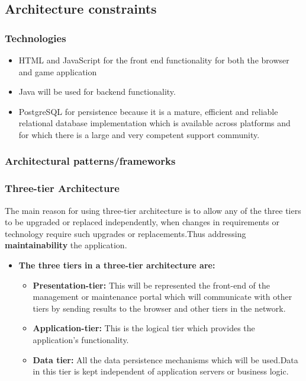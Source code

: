 \documentclass[english]{article}
\begin{document}
			
		\subsection{Architecture constraints}
			\subsubsection{Technologies}
			\begin{itemize}
		  \item HTML and JavaScript for the front end functionality for both the browser and game application
		  \item Java will be used for backend functionality.
		  \item PostgreSQL for persistence because it is a mature, efficient and reliable relational database
          implementation which is available across platforms and for which there is a large and very competent
         support community.
       \end{itemize}
		\subsubsection{Architectural patterns/frameworks}
		\subsubsection{Three-tier Architecture}
		The main reason for using three-tier architecture is to allow any of the three tiers to be upgraded or    			replaced independently, when changes in requirements or technology require such upgrades or           				replacements.Thus addressing \textbf{maintainability} the application.
		
		\vspace{0.5cm}
		
		
		\begin{itemize}
			\item \textbf{The three tiers in a three-tier architecture are:}
			\begin{itemize}
		\item \textbf{Presentation-tier:} This will be represented the front-end of the management or maintenance 			portal which will communicate with other tiers by sending results to the browser and other tiers in the       		network.
		\item \textbf{Application-tier:} This is the logical tier which provides the application's functionality.	
		\item \textbf{Data tier:} All the data persistence mechanisms which will be used.Data in this tier is kept independent of application servers or business logic. 	
	  \end{itemize}
				\end{itemize}
				
\end{document}
